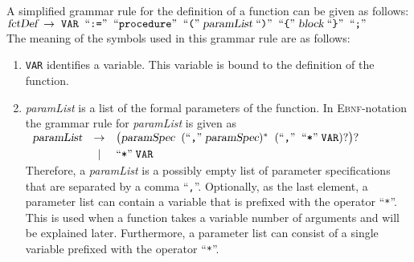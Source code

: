 \noindent
A simplified grammar rule for the definition of a function can be given as follows:
\\[0.2cm]
\hspace*{1.3cm}
$\textsl{fctDef} \;\rightarrow\; \mathtt{VAR}\; \;\mbox{``\texttt{:=}''}\; \;\mbox{``\texttt{procedure}''}\; \;\mbox{``\texttt{(}''}\; \textsl{paramList} 
 \;\mbox{``\texttt{)}''}\; \;\mbox{``\texttt{\{}''}\; \textsl{block} \;\mbox{``\texttt{\}}''}\; \;\mbox{``\texttt{;}''}\;$
\\[0.2cm]
The meaning of the symbols used in this grammar rule are as follows:
\begin{enumerate}
\item \texttt{VAR} identifies a variable.  This variable is bound to the definition of the function.
\item \textsl{paramList} is a list of the formal parameters of the function.  In
      \textsc{Ebnf}-notation the grammar rule for \textsl{paramList} is given as
      \\[0.2cm]
      \hspace*{1.3cm}
      $
      \begin{array}[t]{lcl}
        \textsl{paramList} & \rightarrow & 
        \bigl(\textsl{paramSpec}\;\; (\mbox{``\texttt{,}''}\; \textsl{paramSpec})^* \;\; (\mbox{``\texttt{,}''} \;\; \mbox{``\texttt{*}''} \;\mathtt{VAR})?\bigr)? \\[0.1cm]
        & \mid & \mbox{``\texttt{*}''} \;\mathtt{VAR} \\
      \end{array}
      $
      \\[0.2cm]
      Therefore, a \textsl{paramList} is a possibly empty list of parameter specifications that are 
      separated by a comma ``\texttt{,}''.  Optionally, as the last element, a parameter list can
      contain a variable that is prefixed with the operator ``\texttt{*}''.  This is used when
      a function takes a variable number of arguments and will be explained later.  Furthermore,
      a parameter list can consist of a single variable prefixed with the operator ``\texttt{*}''.


\end{enumerate}
